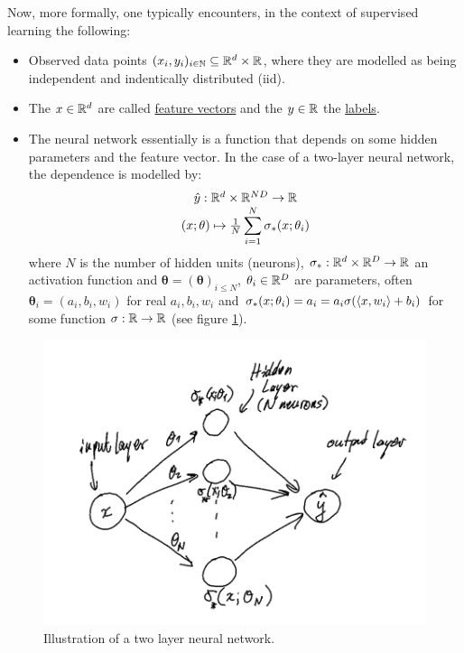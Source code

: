 \documentclass{article}
\begin{document}
Now, more formally, one typically encounters, in the context of supervised learning the following: 
\begin{itemize}
	\item Observed data points $ (x_{i},y_{i})_{i\in \mathbb{N}}\subseteq \mathbb{R}^{d}\times \mathbb{R}$, where they are modelled as being independent and indentically distributed (iid).
	\item The $ x\in \mathbb{R}^{d}$ are called \underline{feature vectors} and the $ y\in \mathbb{R}$ the \underline{labels}.
	\item The neural network essentially is a function that depends on some hidden parameters and the feature vector. In the case of a two-layer neural network, the dependence is modelled by: 
		\begin{equation}\label{eq: neural net def}
			\begin{array}{cc}
			\hat{y}:\mathbb{R}^{d}\times \mathbb{R}^{ND}\to \mathbb{R}   \\
			(x;\mathbf{\theta})\mapsto \frac{1}{N}\displaystyle\sum^{N}_{i=1}\sigma_{*}(x;\mathbf{\theta}_{i})     
	     \end{array}
     \end{equation}
		where $ N$ is the number of hidden units (neurons), $ \sigma_{*}:\mathbb{R}^{d}\times\mathbb{R}^{D}\to \mathbb{R}$ an activation function and $\mathbf{\theta} = (\mathbf{\theta})_{i\leq N}$, $\mathbf{\theta}_{i}\in \mathbb{R}^{D}$ are parameters, often $\mathbf{\theta}_{i} = (a_{i}, b_{i}, w_{i})$ for real $ a_{i}, b_{i}, w_{i}$ and $ \sigma_{*}(x;\mathbf{\theta}_{i})=a_{i}=a_{i}\sigma(\langle x, w_{i}\rangle+b_{i})$ for some function $ \sigma:\mathbb{R}\to \mathbb{R}$ (see figure \ref{fig: two layer neural net}).
\end{itemize}


\begin{figure}[H]
    \centering
    \includegraphics[width=0.6\linewidth]{images/Two-layer-NN.png}
    \caption{ Illustration of a two layer neural network.}
    \label{fig: two layer neural net}
\end{figure}
\end{document}
